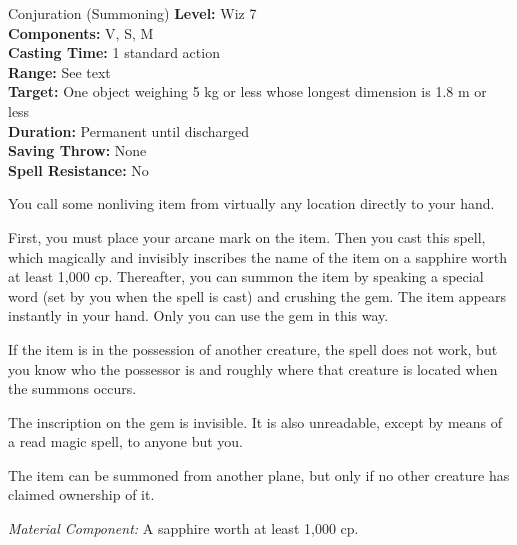 
{Conjuration (Summoning)}
{
	\textbf{Level:}
	Wiz 7\\
	\textbf{Components:}
	V, S, M\\
	\textbf{Casting Time:}
	1 standard action\\
	\textbf{Range:}
	See text\\
	\textbf{Target:}
	One object weighing 5 kg or less whose longest dimension is 1.8 m or less\\
	\textbf{Duration:}
	Permanent until discharged\\
	\textbf{Saving Throw:}
	None\\
	\textbf{Spell Resistance:}
	No\\
}
{
	You call some nonliving item from virtually any location directly to your hand.

	First, you must place your arcane mark on the item. Then you cast this spell, which magically and invisibly inscribes the name of the item on a sapphire worth at least 1,000 cp. Thereafter, you can summon the item by speaking a special word (set by you when the spell is cast) and crushing the gem. The item appears instantly in your hand. Only you can use the gem in this way.

	If the item is in the possession of another creature, the spell does not work, but you know who the possessor is and roughly where that creature is located when the summons occurs.

	The inscription on the gem is invisible. It is also unreadable, except by means of a read magic spell, to anyone but you.

	The item can be summoned from another plane, but only if no other creature has claimed ownership of it.

	\textit{Material Component:}
	A sapphire worth at least 1,000 cp.

}
